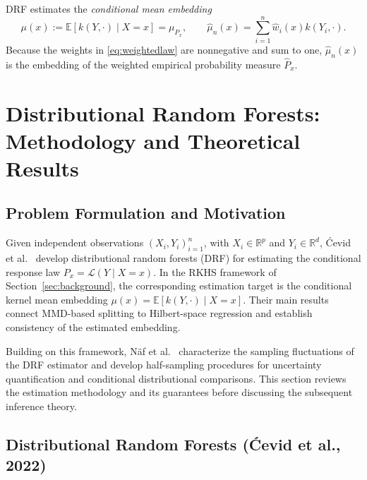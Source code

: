 \documentclass[12pt,a4paper]{article}
\newcommand{\E}{\mathbb E}
\newcommand{\R}{\mathbb R}
\newcommand{\1}{\mathbf 1}
\begin{document}
DRF estimates the \emph{conditional mean embedding}
\begin{equation}\label{eq:cme}
 \mu(x):=\E[k(Y,\cdot)\mid X=x]=\mu_{P_x},\qquad
 \widehat\mu_n(x)=\sum_{i=1}^n\widehat w_i(x)k(Y_i,\cdot).
\end{equation}
Because the weights in \eqref{eq:weightedlaw} are nonnegative and sum to one, $\widehat\mu_n(x)$ is the embedding of the weighted empirical probability measure $\widehat P_x$.

\section{Distributional Random Forests: Methodology and Theoretical Results}
\label{sec:method}

\subsection{Problem Formulation and Motivation}
Given independent observations $(X_i,Y_i)_{i=1}^n$, with $X_i\in\R^p$ and $Y_i\in\R^d$, \'{C}evid et al.\ \cite{cevid2022} develop distributional random forests (DRF) for estimating the conditional response law $P_x=\mathcal L(Y\mid X=x)$. In the RKHS framework of Section~\ref{sec:background}, the corresponding estimation target is the conditional kernel mean embedding $\mu(x)=\E[k(Y,\cdot)\mid X=x]$. Their main results connect MMD-based splitting to Hilbert-space regression and establish consistency of the estimated embedding.

Building on this framework, N\"af et al.\ \cite{naf2023} characterize the sampling fluctuations of the DRF estimator and develop half-sampling procedures for uncertainty quantification and conditional distributional comparisons. This section reviews the estimation methodology and its guarantees before discussing the subsequent inference theory.

\subsection{Distributional Random Forests (\texorpdfstring{\'{C}}{C}evid et al., 2022)}
\end{document}
